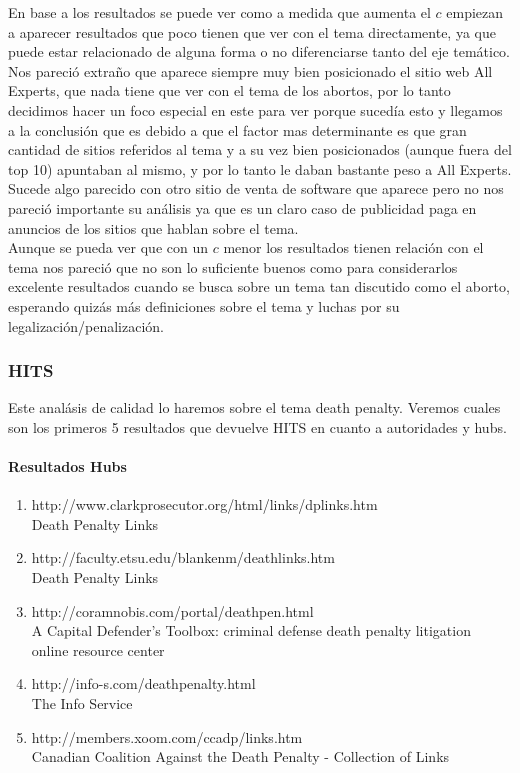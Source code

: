 En base a los resultados se puede ver como a medida que aumenta el $c$ empiezan a aparecer resultados que poco tienen que ver con el tema directamente, ya que puede estar relacionado de alguna forma o no diferenciarse tanto del eje temático.\\
Nos pareció extraño que aparece siempre muy bien posicionado el sitio web All Experts, que nada tiene que ver con el tema de los abortos, por lo tanto decidimos hacer un foco especial en este para ver porque sucedía esto y llegamos a la conclusión que es debido a que el factor mas determinante es que gran cantidad de sitios referidos al tema y a su vez bien posicionados (aunque fuera del top 10) apuntaban al mismo, y por lo tanto le daban bastante peso a All Experts.\\
Sucede algo parecido con otro sitio de venta de software que aparece pero no nos pareció importante su análisis ya que es un claro caso de publicidad paga en anuncios de los sitios que hablan sobre el tema.\\
Aunque se pueda ver que con un $c$ menor los resultados tienen relación con el tema nos pareció que no son lo suficiente buenos como para considerarlos excelente resultados cuando se busca sobre un tema tan discutido como el aborto, esperando quizás más definiciones sobre el tema y luchas por su legalización/penalización. 

\subsubsection{HITS}
Este analásis de calidad lo haremos sobre el tema death penalty. Veremos cuales son los primeros 5 resultados que devuelve HITS en cuanto a autoridades y hubs.

\paragraph{Resultados Hubs}
\begin{enumerate}
\item
http://www.clarkprosecutor.org/html/links/dplinks.htm\\
Death Penalty Links
\item
http://faculty.etsu.edu/blankenm/deathlinks.htm\\
Death Penalty Links
\item
http://coramnobis.com/portal/deathpen.html\\
A Capital Defender's Toolbox: criminal defense  death penalty litigation online resource center
\item
http://info-s.com/deathpenalty.html\\
The Info Service
\item
http://members.xoom.com/ccadp/links.htm\\
Canadian Coalition Against the Death Penalty - Collection of Links


\end{enumerate}

